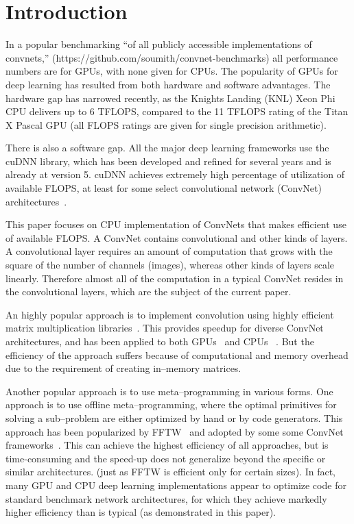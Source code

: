 \section{Introduction}

  In a popular benchmarking ``of all publicly accessible
  implementations of convnets,''
  (https://github.com/soumith/convnet-benchmarks) all performance
  numbers are for GPUs, with none given for CPUs.  The popularity of
  GPUs for deep learning has resulted from both hardware and software
  advantages.  The hardware gap has narrowed recently, as the Knights
  Landing (KNL) Xeon Phi CPU delivers up to 6 TFLOPS, compared to the
  11 TFLOPS rating of the Titan X Pascal GPU (all FLOPS ratings are
  given for single precision arithmetic).

  There is also a software gap.  All the major deep learning
  frameworks use the cuDNN library, which has been developed and
  refined for several years and is already at version 5.  cuDNN
  achieves extremely high percentage of utilization of available
  FLOPS, at least for some select convolutional network (ConvNet)
  architectures~\cite{imagenetwinners}.

  This paper focuses on CPU implementation of ConvNets that makes
  efficient use of available FLOPS.  A ConvNet contains convolutional
  and other kinds of layers.  A convolutional layer requires an amount
  of computation that grows with the square of the number of channels
  (images), whereas other kinds of layers scale linearly.  Therefore
  almost all of the computation in a typical ConvNet resides in the
  convolutional layers, which are the subject of the current paper.

  An highly popular approach is to implement convolution using highly
  efficient matrix multiplication
  libraries~\cite{chellapilla2006high}.  This provides speedup for
  diverse ConvNet architectures, and has been applied to both
  GPUs~\cite{chetlur2014cudnn,neonnervana} and CPUs
  ~\cite{hadjis2015shallow}.  But the efficiency of the approach
  suffers because of computational and memory overhead due to the
  requirement of creating in--memory matrices.

  Another popular approach is to use meta--programming in various
  forms.  One approach is to use offline meta--programming, where the
  optimal primitives for solving a sub--problem are either optimized
  by hand or by code generators.  This approach has been popularized
  by FFTW~\cite{frigo1998fftw,frigo1999fftw} and adopted by some some
  ConvNet frameworks~\cite{klockner2012pycuda,nervanagpu}.  This can
  achieve the highest efficiency of all approaches, but is
  time-consuming and the speed-up does not generalize beyond the
  specific or similar architectures.  (just as FFTW is efficient only
  for certain sizes).  In fact, many GPU and CPU deep learning
  implementations appear to optimize code for standard benchmark
  network architectures, for which they achieve markedly higher
  efficiency than is typical (as demonstrated in this paper).

